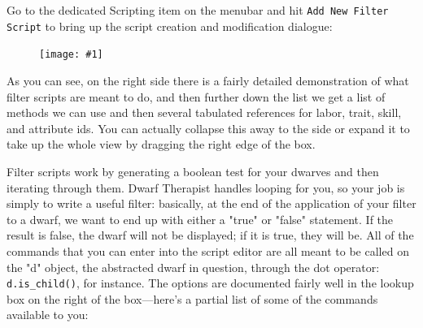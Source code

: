 \documentclass[]{article}
\newcommand{\fullfigure}[1] {
\begin{figure}[h!]
\texttt{[image: \#1]}
\end{figure}
}
\begin{document}
Go to the dedicated Scripting item on the menubar and hit \texttt{Add New Filter Script} to bring up the
script creation and modification dialogue:

\fullfigure{Sec4Fig1}

As you can see, on the right side there is a fairly detailed demonstration of what filter scripts are
meant to do, and then further down the list we get a list of methods we can use and then several
tabulated references for labor, trait, skill, and attribute ids. You can actually collapse this away to
the side or expand it to take up the whole view by dragging the right edge of the box.

Filter scripts work by generating a boolean test for your dwarves and then iterating through them. Dwarf
Therapist handles looping for you, so your job is simply to write a useful filter: basically, at the end
of the application of your filter to a dwarf, we want to end up with either a "true" or "false"
statement. If the result is false, the dwarf will not be displayed; if it is true, they will be. All of
the commands that you can enter into the script editor are all meant to be called on the "d" object, the
abstracted dwarf in question, through the dot operator: \texttt{d.is\_child()}, for instance. The
options are documented fairly well in the lookup box on the right of the box---here's a partial list of
some of the commands available to you:
\vspace{12pt}
\end{document}
